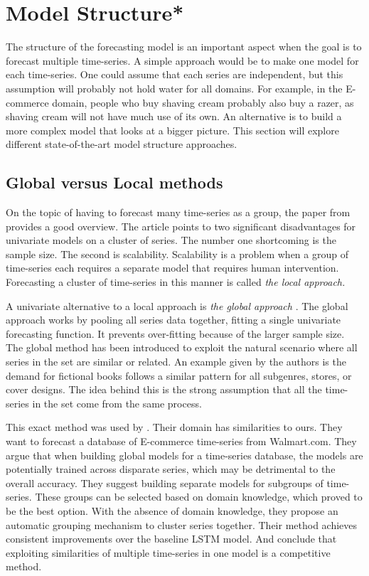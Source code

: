 \section{Model Structure*}
\label{section:RelatedWork:Model-structure}
The structure of the forecasting model is an important aspect when the goal is to forecast
multiple time-series.
A simple approach would be to make one model for each time-series.
One could assume that each series are independent, but this assumption will probably not hold water for all domains.
For example, in the E-commerce domain,
people who buy shaving cream probably also buy a razer, as shaving cream will not have much use of its own.
An alternative is to build a more complex model that looks at a bigger picture.
This section will explore different state-of-the-art model structure approaches.

\subsection{Global versus Local methods}
\label{section:RelatedWork:Model-structure:local-vs-global}
On the topic of having to forecast many time-series as a group, the paper from \cite{Montero-Manso2021} provides a good overview.
The article points to two significant disadvantages for univariate models on a cluster of series.
The number one shortcoming is the sample size. The second is scalability.
Scalability is a problem when a group of time-series each requires a separate model
that requires human intervention. Forecasting a cluster of time-series in this manner is called
\textit{the local approach.}

A univariate alternative to a local approach is \textit{the global approach}
\citep{Rabanser2020}.
The global approach works by pooling all series data together, fitting a single univariate forecasting function. It prevents over-fitting because of the larger sample size.
The global method has been introduced to exploit the natural scenario where all series
in the set are similar or related. An example given by the authors is the demand for fictional
books follows a similar pattern for all subgenres, stores, or cover designs.
The idea behind this is the strong assumption that all the time-series in the set
come from the same process.

This exact method was used by \cite{Bandara2017}.
Their domain has similarities to ours.
They want to forecast a database of E-commerce time-series
from Walmart.com.
They argue that when building global models for a time-series database, the models are
potentially trained across disparate series, which may be detrimental to the overall accuracy.
They suggest building separate models for subgroups of time-series.
These groups can be selected based on domain knowledge, which proved to be the best option. With the absence of
domain knowledge, they propose an automatic grouping mechanism to cluster series together.
Their method achieves consistent improvements over the baseline LSTM model.
And conclude that exploiting similarities of multiple time-series in one model is a competitive method.

